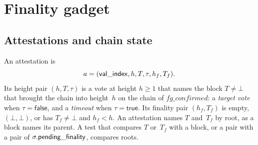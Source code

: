 \section{Finality gadget}\label{sec:fg}

\subsection{Attestations and chain state}\label{sec:fg-state}

An attestation is
\[
 a=(\mathsf{val\_index},h,T,\tau,h_f,T_f).
\]
Its height pair $(h,T,\tau)$ is a vote at height $h\geq1$ that names the
block $T\neq\bot$ that brought the chain into height~$h$ on the
chain of $\mathit{fg\_confirmed}$: a \emph{target vote} when $\tau=\mathsf{false}$, and a
\emph{timeout} when $\tau=\mathsf{true}$.  Its finality pair $(h_f,T_f)$ is
empty, $(\bot,\bot)$, or has $T_f\neq\bot$ and $h_f<h$.
An attestation names $T$ and~$T_f$ by root, as a block names its parent.  A
test that compares $T$ or~$T_f$ with a block, or a pair with a pair of
$\sigma.\mathsf{pending\_finality}$, compares roots.

